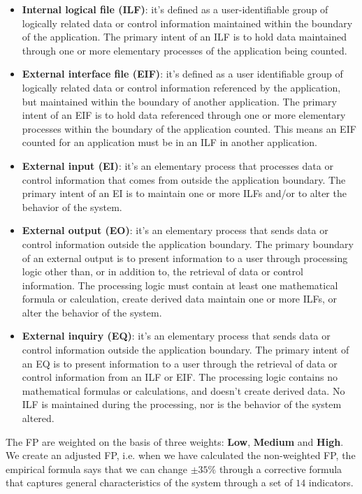 \begin{itemize}
    \item \textbf{Internal logical file (ILF)}: it's defined as a user-identifiable group of logically related data or control information maintained within the boundary of the application. The primary intent of an ILF is to hold data maintained through one or more elementary processes of the application being counted.
    \item \textbf{External interface file (EIF)}: it's defined as a user identifiable group of logically related data or control information referenced by the application, but maintained within the boundary of another application. The primary intent of an EIF is to hold data referenced through one or more elementary processes within the boundary of the application counted. This means an EIF counted for an application must be in an ILF in another application.
    \item \textbf{External input (EI)}: it's an elementary process that processes data or control information that comes from outside the application boundary. The primary intent of an EI is to maintain one or more ILFs and/or to alter the behavior of the system.
    \item \textbf{External output (EO)}: it's an elementary process that sends data or control information outside the application boundary. The primary boundary of an external output is to present information to a user through processing logic other than, or in addition to, the retrieval of data or control information. The processing logic must contain at least one mathematical formula or calculation, create derived data maintain one or more ILFs, or alter the behavior of the system.
    \item \textbf{External inquiry (EQ)}: it's an elementary process that sends data or control information outside the application boundary. The primary intent of an EQ is to present information to a user through the retrieval of data or control information from an ILF or EIF. The processing logic contains no mathematical formulas or calculations, and doesn't create derived data. No ILF is maintained during the processing, nor is the behavior of the system altered.
\end{itemize}
The FP are weighted on the basis of three weights: \textbf{Low}, \textbf{Medium} and \textbf{High}.
We create an adjusted FP, i.e. when we have calculated the non-weighted FP, the empirical formula says that we can change $\pm 35\%$ through a corrective formula that captures general characteristics of the system through a set of $14$ indicators.
